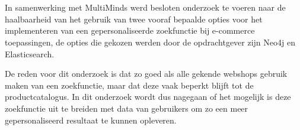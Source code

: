 
%
%

%



\chapter*{}

In samenwerking met MultiMinds werd besloten onderzoek te voeren naar de haalbaarheid van het gebruik van twee vooraf bepaalde opties voor het implementeren van een gepersonaliseerde zoekfunctie bij e-commerce toepassingen, de  opties die gekozen werden door de opdrachtgever zijn Neo4j en Elasticsearch.  

De reden voor dit onderzoek is dat zo goed als alle gekende webshops gebruik maken van een zoekfunctie, maar dat deze vaak beperkt blijft tot de productcatalogus. In dit onderzoek wordt dus nagegaan of het mogelijk is deze zoekfunctie uit te breiden met data van gebruikers om zo een meer gepersonaliseerd resultaat te kunnen opleveren.

